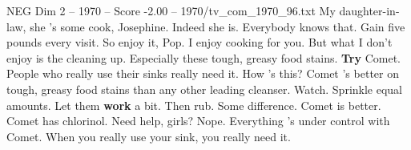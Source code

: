 \begin{textsample}{NEG Dim 2 – 1970 – Score -2.00 – 1970/tv\_com\_1970\_96.txt}  \label{ex:f2_neg_041}
My daughter-in-law, she 's some cook, Josephine.
Indeed she is.
Everybody knows that.
Gain five pounds every visit.
So enjoy it, Pop.
I enjoy cooking for you.
But what I don't enjoy is the cleaning up.
Especially these tough, greasy food stains. \textbf{Try} Comet.
People who really use their sinks really need it.
How 's this?
Comet 's better on tough, greasy food stains than any other leading cleanser.
Watch.
Sprinkle equal amounts.
Let them \textbf{work} a bit.
Then rub.
Some difference.
Comet is better.
Comet has chlorinol.
Need help, girls?
Nope.
Everything 's under control with Comet.
When you really use your sink, you really need it.

\end{textsample}
